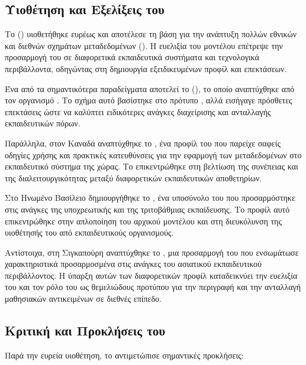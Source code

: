 \subsection{Υιοθέτηση και Εξελίξεις του }
\label{subsec:lom_adoption}

Το     () υιοθετήθηκε ευρέως και αποτέλεσε τη βάση για την ανάπτυξη πολλών εθνικών και διεθνών σχημάτων μεταδεδομένων (). Η ευελιξία του μοντέλου επέτρεψε την προσαρμογή του σε διαφορετικά εκπαιδευτικά συστήματα και τεχνολογικά περιβάλλοντα, οδηγώντας στη δημιουργία εξειδικευμένων προφίλ και επεκτάσεων.

Ένα από τα σημαντικότερα παραδείγματα αποτελεί το     (), το οποίο αναπτύχθηκε από τον οργανισμό  . Το σχήμα αυτό βασίστηκε στο πρότυπο  , αλλά εισήγαγε πρόσθετες επεκτάσεις ώστε να καλύπτει ειδικότερες ανάγκες διαχείρισης και ανταλλαγής εκπαιδευτικών πόρων.

Παράλληλα, στον Καναδά αναπτύχθηκε το , ένα προφίλ του  που παρείχε σαφείς οδηγίες χρήσης και πρακτικές κατευθύνσεις για την εφαρμογή των μεταδεδομένων στο εκπαιδευτικό σύστημα της χώρας. Το  επικεντρώθηκε στη βελτίωση της συνέπειας και της διαλειτουργικότητας μεταξύ διαφορετικών εκπαιδευτικών αποθετηρίων.

Στο Ηνωμένο Βασίλειο δημιουργήθηκε το   , ένα υποσύνολο του  που προσαρμόστηκε στις ανάγκες της υποχρεωτικής και της τριτοβάθμιας εκπαίδευσης. Το προφίλ αυτό επικεντρώθηκε στην απλοποίηση του αρχικού μοντέλου και στη διευκόλυνση της υιοθέτησής του από εκπαιδευτικούς οργανισμούς.

Αντίστοιχα, στη Σιγκαπούρη αναπτύχθηκε το , μια προσαρμογή του  που ενσωμάτωσε χαρακτηριστικά προσαρμοσμένα στις ανάγκες του ασιατικού εκπαιδευτικού περιβάλλοντος. Η ύπαρξη αυτών των διαφορετικών προφίλ καταδεικνύει την ευελιξία του  και τον ρόλο του ως θεμελιώδους προτύπου για την περιγραφή και την ανταλλαγή μαθησιακών αντικειμένων σε διεθνές επίπεδο.
\subsection{Κριτική και Προκλήσεις του  }
\label{subsec:lom_challenges}

Παρά την ευρεία υιοθέτηση, το   αντιμετώπισε σημαντικές προκλήσεις:

